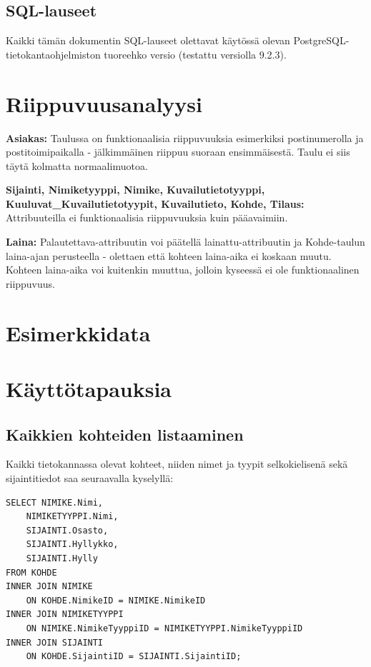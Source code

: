 \documentclass{article}
\begin{document}
\subsection{SQL-lauseet}

Kaikki tämän dokumentin SQL-lauseet olettavat käytössä olevan PostgreSQL-tietokantaohjelmiston tuoreehko versio (testattu versiolla 9.2.3).



\section{Riippuvuusanalyysi}

\textbf{Asiakas:} Taulussa on funktionaalisia riippuvuuksia esimerkiksi postinumerolla ja postitoimipaikalla - jälkimmäinen riippuu suoraan ensimmäisestä. Taulu ei siis täytä kolmatta normaalimuotoa.

\textbf{Sijainti, Nimiketyyppi, Nimike, Kuvailutietotyyppi, Kuuluvat\_\-Kuvailutietotyypit, Kuvailutieto, Kohde, Tilaus:} Attribuuteilla ei funktionaalisia riippuvuuksia kuin pääavaimiin.

\textbf{Laina:} Palautettava-attribuutin voi päätellä lainattu-attribuutin ja Kohde-taulun laina-ajan perusteella - olettaen että kohteen laina-aika ei koskaan muutu. Kohteen laina-aika voi kuitenkin muuttua, jolloin kyseessä ei ole funktionaalinen riippuvuus.

\section{Esimerkkidata}



\section{Käyttötapauksia}

\subsection{Kaikkien kohteiden listaaminen}

Kaikki tietokannassa olevat kohteet, niiden nimet ja tyypit selkokielisenä sekä sijaintitiedot saa seuraavalla kyselyllä:

\begin{lstlisting}
SELECT NIMIKE.Nimi,
    NIMIKETYYPPI.Nimi,
    SIJAINTI.Osasto,
    SIJAINTI.Hyllykko,
    SIJAINTI.Hylly
FROM KOHDE
INNER JOIN NIMIKE
    ON KOHDE.NimikeID = NIMIKE.NimikeID
INNER JOIN NIMIKETYYPPI
    ON NIMIKE.NimikeTyyppiID = NIMIKETYYPPI.NimikeTyyppiID
INNER JOIN SIJAINTI
    ON KOHDE.SijaintiID = SIJAINTI.SijaintiID;
\end{lstlisting}
\end{document}
